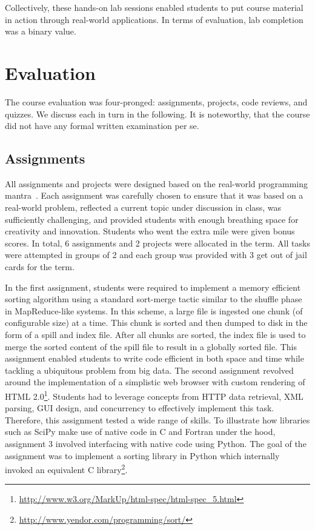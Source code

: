 \documentclass[letterpaper,twocolumn,10pt]{article}
\begin{document}
Collectively, these hands-on lab sessions enabled students to put course
material in action through real-world applications. In terms of evaluation, lab
completion was a binary value. 

\section{Evaluation}\label{sec:evaluation}
The course evaluation was four-pronged: assignments, projects, code reviews,
and quizzes. We discuss each in turn in the following. It is noteworthy, that
the course did not have any formal written examination per se.
\subsection{Assignments}
All assignments and projects were designed based on the real-world programming
mantra~\cite{Stevenson:2006:DRP}. Each assignment was carefully chosen to ensure
that it was based on a real-world problem, reflected a current topic under
discussion in class, was sufficiently challenging, and provided students with
enough breathing space for creativity and innovation. Students who went the
extra mile were given bonus scores. In total, 6 assignments and 2 projects were
allocated in the term. All tasks were attempted in groups of 2 and each group
was provided with 3 get out of jail cards for the term.

In the first assignment, students were required to implement a memory efficient
sorting algorithm using a standard sort-merge tactic similar to the shuffle
phase in MapReduce-like systems. In this scheme, a large file is ingested one
chunk (of configurable size) at a time. This chunk is sorted and then dumped to
disk in the form of a spill and index file. After all chunks are sorted, the
index file is used to merge the sorted content of the spill file to result in a
globally sorted file. This assignment enabled students to write code efficient
in both space and time while tackling a ubiquitous problem from big data. The
second assignment revolved around the implementation of a simplistic web browser
with custom rendering of HTML
2.0\footnote{\url{http://www.w3.org/MarkUp/html-spec/html-spec_5.html}}.
Students had to leverage concepts from HTTP data retrieval, XML parsing, GUI
design, and concurrency to effectively implement this task. Therefore, this
assignment tested a wide range of skills. To illustrate how libraries such as
SciPy make use of native code in C and Fortran under the hood, assignment 3
involved interfacing with native code using Python. The goal of the assignment
was to implement a sorting library in Python which internally invoked an
equivalent C library\footnote{\url{http://www.yendor.com/programming/sort/}}.
\end{document}
